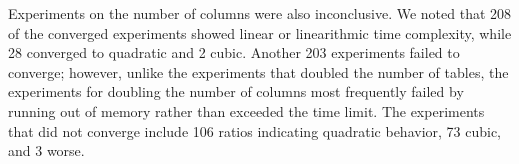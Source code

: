 Experiments on the number of columns were also inconclusive.  We noted that 208 of the converged experiments showed
linear or linearithmic time complexity, while 28 converged to quadratic and 2 cubic.  Another 203 experiments failed to
converge; however, unlike the experiments that doubled the number of tables, the experiments for doubling the number of
columns most frequently failed by running out of memory rather than exceeded the time limit. The experiments that did not
converge include 106 ratios indicating quadratic behavior, 73 cubic, and 3 worse.




